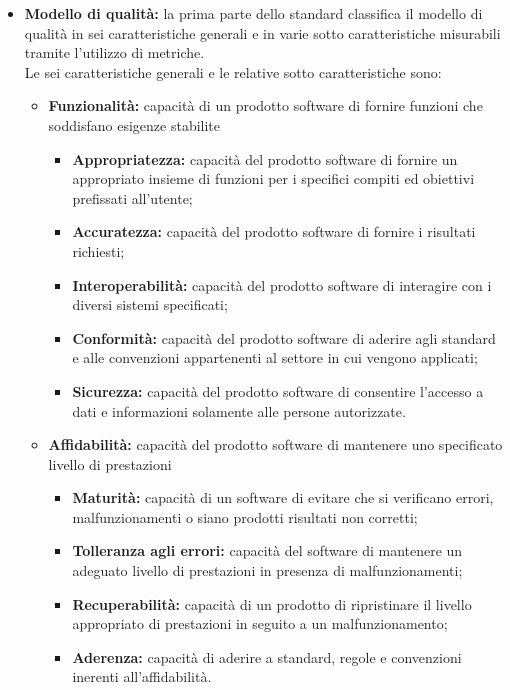 		\begin{itemize}
			\item \textbf{Modello di qualità: } la prima parte dello standard classifica il modello di qualità in sei caratteristiche generali e in varie sotto caratteristiche misurabili tramite l'utilizzo di metriche.\\
			Le sei caratteristiche generali e le relative sotto caratteristiche sono:
				\begin{itemize}
					\item \textbf{Funzionalità:} capacità di un prodotto software di fornire funzioni che soddisfano esigenze stabilite
						\begin{itemize}
							\item \textbf{Appropriatezza:} capacità del prodotto software di fornire un appropriato insieme di funzioni per i specifici compiti ed obiettivi prefissati all'utente;
							\item \textbf{Accuratezza:} capacità del prodotto software di fornire i risultati richiesti;
							\item \textbf{Interoperabilità:} capacità del prodotto software di interagire con i diversi sistemi specificati;
							\item \textbf{Conformità:} capacità del prodotto software di aderire agli standard e alle convenzioni appartenenti al settore in cui vengono applicati;
							\item \textbf{Sicurezza:} capacità del prodotto software di consentire l'accesso a dati e informazioni solamente alle persone autorizzate.
						\end{itemize}
					\item \textbf{Affidabilità:} capacità del prodotto software di mantenere uno specificato livello di prestazioni
						\begin{itemize}
							\item \textbf{Maturità:} capacità di un software di evitare che si verificano errori, malfunzionamenti o siano prodotti risultati non corretti;
							\item \textbf{Tolleranza agli errori:} capacità del software di mantenere un adeguato livello di prestazioni in presenza di malfunzionamenti;
							\item \textbf{Recuperabilità:} capacità di un prodotto di ripristinare il livello appropriato di prestazioni in seguito a un malfunzionamento;
							\item \textbf{Aderenza:} capacità di aderire a standard, regole e convenzioni inerenti all'affidabilità.

\end{itemize}
\end{itemize}
\end{itemize}
